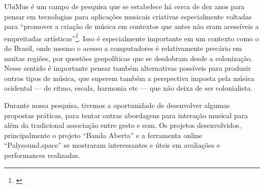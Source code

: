 UbiMus é um campo de pesquisa que se estabelece há cerca de dez anos para pensar em tecnologias para aplicações musicais criativas especialmente voltadas para ``promover a criação de música em contextos que antes não eram acessíveis a empreitadas artísticas''\footnote{\cite{Keller2018}}. Isso é especialmente importante em um contexto como o do Brasil, onde mesmo o acesso a computadores é relativamente precário em muitas regiões, por questões geopolíticas que se desdobram desde a colonização. Nesse sentido é importante pensar também alternativas possíveis para produzir outros tipos de música, que superem também a perspectiva imposta pela música ocidental --- de ritmo, escala, harmonia etc --- que não deixa de ser colonialista.


Durante nossa pesquisa, tivemos a oportunidade de desenvolver algumas propostas práticas, para tentar outras abordagens para interação musical para além da tradicional associação entre gesto e som. Os projetos desenvolvidos, principalmente o projeto ``Banda Aberta'' e a ferramenta online ``Palysound.space'' se mostraram interessantes e úteis em avaliações e performances realizadas. 

